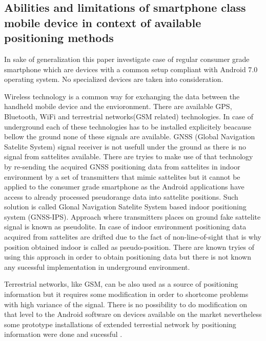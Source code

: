 \documentclass[../main.tex]{subfiles}
\begin{document}
\subsection{Abilities and limitations of smartphone class mobile device in context of available positioning methods}
\label{subs:smartphone_abilities_and_limitations}

In sake of generalization this paper investigate case of regular consumer grade smartphone which are devices with a common setup compliant with Android 7.0 operating system. No specialized devices are taken into consideration.

Wireless technology is a common way for exchanging the data between the handheld mobile device and the envioronment. There are available GPS, Bluetooth, WiFi and terrestrial networks(GSM related) technologies. In case of underground each of these technologies has to be installed explicitely beacause bellow the ground none of these signals are available. GNSS (Global Navigation Satelite System) signal receiver is not usefull under the ground as there is no signal from sattelites available. There are tryies to make use of that technology by re-sending the acquired GNSS positioning data from sattelites in indoor environment by a set of transmitters that mimic sattelites \cite{GPS_retransmission} but it cannot be applied to the consumer grade smartphone as the Android applications have access to already processed pseudorange data into sattelite positions. Such solution is called Glonal Navigation Satelite System based indoor positioning system (GNSS-IPS)\cite{GPS_retransmission_differential}. Approach where transmitters places on ground fake sattelite signal is known as pseudolite. In case of indoor environment positioning data acquired from sattelites are drifted due to the fact of non-line-of-sight that is why position obtained indoor is called as pseudo-position. There are known tryies of using this approach in order to obtain positioning data but there is not known any sucessful implementation in underground environment.

Terrestrial networks, like GSM, can be also used as a source of positioning information but it requires some modification in order to shortcome problems with high variance of the signal. There is no possibility to do modification on that level to the Android software on devices available on the market nevertheless some prototype installations of extended terrestial network by positioning information were done and sucessful \cite{terrestrial_positioning}\cite{terrestrial_positioning_tdoa}.
\end{document}
